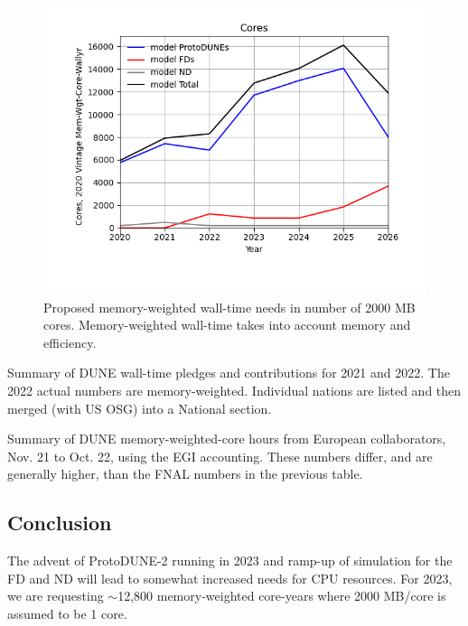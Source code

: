 \documentclass[12pt]{article}
\begin{document}
\begin{figure}[h]
\centering\includegraphics[height=0.4\textwidth]{MoreSim_2022-11-21-2026/MoreSim_2022-11-21-2026-Cores.png}
\caption{Proposed memory-weighted wall-time needs in number of 2000 MB cores. Memory-weighted  wall-time takes into account memory and efficiency.}\label{fig:CoresMain}
\end{figure}

\begin{table}[ht]
\centering{}
\caption{Summary  of DUNE wall-time pledges and contributions for 2021 and 2022.  The 2022 actual numbers are memory-weighted.  Individual nations are listed and then merged (with US OSG) into a National section.} 
\label{tab:CPUUsage}
\end{table}

\begin{table}[ht]
\centering{}
\caption{Summary  of DUNE memory-weighted-core hours from European collaborators, Nov. 21 to Oct. 22, using the EGI accounting\cite{EGI2022}. These numbers differ, and are generally higher, than the FNAL numbers in the previous table.} \label{tab:EIGSummary}
\end{table}

\subsection{Conclusion}\label{sec:cpuresult} The advent of ProtoDUNE-2 running in 2023 and ramp-up of simulation for the FD and ND will lead to somewhat increased needs for CPU resources.  For 2023, we are requesting $\sim$12,800 memory-weighted core-years where 2000 MB/core is assumed to be 1 core. 

%
\end{document}
